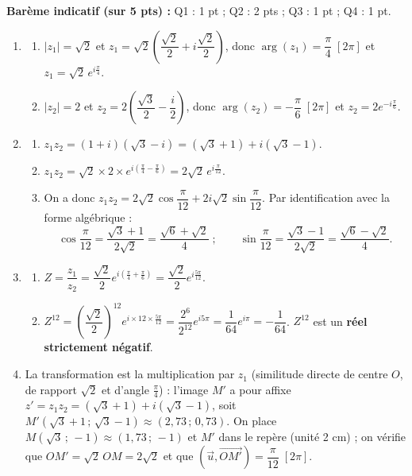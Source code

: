 \documentclass[11pt]{article}
\begin{document}
\begin{corrige}
\textbf{Barème indicatif (sur 5 pts) :} Q1 : 1 pt ; Q2 : 2 pts ; Q3 : 1 pt ; Q4 : 1 pt.

\begin{enumerate}
\item \begin{enumerate}
\item $|z_1| = \sqrt{2}$ et $z_1 = \sqrt{2}\left(\dfrac{\sqrt{2}}{2} + i\dfrac{\sqrt{2}}{2}\right)$, donc $\arg(z_1) = \dfrac{\pi}{4}\;[2\pi]$ et $z_1 = \sqrt{2}\,e^{i\frac{\pi}{4}}$.
\item $|z_2| = 2$ et $z_2 = 2\left(\dfrac{\sqrt{3}}{2} - \dfrac{i}{2}\right)$, donc $\arg(z_2) = -\dfrac{\pi}{6}\;[2\pi]$ et $z_2 = 2e^{-i\frac{\pi}{6}}$.
\end{enumerate}
\item \begin{enumerate}
\item $z_1z_2 = (1 + i)(\sqrt{3} - i) = (\sqrt{3} + 1) + i(\sqrt{3} - 1)$.
\item $z_1z_2 = \sqrt{2} \times 2 \times e^{i\left(\frac{\pi}{4} - \frac{\pi}{6}\right)} = 2\sqrt{2}\,e^{i\frac{\pi}{12}}$.
\item On a donc $z_1z_2 = 2\sqrt{2}\cos\dfrac{\pi}{12} + 2i\sqrt{2}\sin\dfrac{\pi}{12}$. Par identification avec la forme algébrique :
\[ \cos\frac{\pi}{12} = \frac{\sqrt{3} + 1}{2\sqrt{2}} = \frac{\sqrt{6} + \sqrt{2}}{4} \;; \qquad \sin\frac{\pi}{12} = \frac{\sqrt{3} - 1}{2\sqrt{2}} = \frac{\sqrt{6} - \sqrt{2}}{4}. \]
\end{enumerate}
\item \begin{enumerate}
\item $Z = \dfrac{z_1}{z_2} = \dfrac{\sqrt{2}}{2}e^{i\left(\frac{\pi}{4} + \frac{\pi}{6}\right)} = \dfrac{\sqrt{2}}{2}e^{i\frac{5\pi}{12}}$.
\item $Z^{12} = \left(\dfrac{\sqrt{2}}{2}\right)^{12} e^{i \times 12 \times \frac{5\pi}{12}} = \dfrac{2^6}{2^{12}}e^{i5\pi} = \dfrac{1}{64}e^{i\pi} = -\dfrac{1}{64}$. $Z^{12}$ est un \textbf{réel strictement négatif}.
\end{enumerate}
\item La transformation est la multiplication par $z_1$ (similitude directe de centre $O$, de rapport $\sqrt{2}$ et d'angle $\frac{\pi}{4}$) : l'image $M'$ a pour affixe $z' = z_1 z_2 = (\sqrt{3} + 1) + i(\sqrt{3} - 1)$, soit $M'\left(\sqrt{3} + 1\,;\,\sqrt{3} - 1\right) \approx (2{,}73\,;\,0{,}73)$. On place $M(\sqrt{3}\,;\,-1) \approx (1{,}73\,;\,-1)$ et $M'$ dans le repère (unité 2 cm) ; on vérifie que $OM' = \sqrt{2}\,OM = 2\sqrt{2}$ et que $\left(\vec{u}, \overrightarrow{OM'}\right) = \dfrac{\pi}{12}\;[2\pi]$.
\end{enumerate}
\end{corrige}
\end{document}
